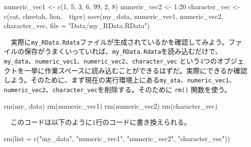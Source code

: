 \documentclass[
  a4paper,
  pandoc,
  ja=standard,
  jafont=haranoaji]{bxjsbook}
\newenvironment{Shaded}{\begin{snugshade}}{\end{snugshade}}
\newcommand{\AttributeTok}[1]{\textcolor[rgb]{0.00,0.48,0.65}{#1}}
\newcommand{\DecValTok}[1]{\textcolor[rgb]{0.68,0.00,0.00}{#1}}
\newcommand{\FunctionTok}[1]{\textcolor[rgb]{0.28,0.35,0.67}{#1}}
\newcommand{\NormalTok}[1]{\textcolor[rgb]{0.00,0.48,0.65}{#1}}
\newcommand{\OtherTok}[1]{\textcolor[rgb]{0.00,0.48,0.65}{#1}}
\newcommand{\SpecialCharTok}[1]{\textcolor[rgb]{0.37,0.37,0.37}{#1}}
\newcommand{\StringTok}[1]{\textcolor[rgb]{0.13,0.47,0.30}{#1}}
\begin{document}
\begin{Shaded}
\begin{Highlighting}[numbers=left,,]
\NormalTok{numeric\_vec1  }\OtherTok{\textless{}{-}} \FunctionTok{c}\NormalTok{(}\DecValTok{1}\NormalTok{, }\DecValTok{5}\NormalTok{, }\DecValTok{3}\NormalTok{, }\DecValTok{6}\NormalTok{, }\DecValTok{99}\NormalTok{, }\DecValTok{2}\NormalTok{, }\DecValTok{8}\NormalTok{)}
\NormalTok{numeric\_vec2  }\OtherTok{\textless{}{-}} \DecValTok{1}\SpecialCharTok{:}\DecValTok{20}
\NormalTok{character\_vec }\OtherTok{\textless{}{-}} \FunctionTok{c}\NormalTok{(}\StringTok{\textquotesingle{}cat\textquotesingle{}}\NormalTok{, }\StringTok{\textquotesingle{}cheetah\textquotesingle{}}\NormalTok{, }\StringTok{\textquotesingle{}lion\textquotesingle{}}\NormalTok{,　}\StringTok{\textquotesingle{}tiger\textquotesingle{}}\NormalTok{)}
\FunctionTok{save}\NormalTok{(my\_data, numeric\_vec1, numeric\_vec2, character\_vec, }
     \AttributeTok{file =} \StringTok{"Data/my\_RData.RData"}\NormalTok{)}
\end{Highlighting}
\end{Shaded}

　実際に\texttt{my\_RData.Rdata}ファイルが生成されているかを確認してみよう。ファイルの保存がうまくいっていれば、\texttt{my\_RData.Rdata}を読み込むだけで、\texttt{my\_data}、\texttt{numeric\_vec1}、\texttt{numeric\_vec2}、\texttt{character\_vec}
という4つのオブジェクトを一挙に作業スペースに読み込むことができるはずだ。実際にできるか確認しよう。そのために、まず現在の実行環境上にある\texttt{my\_ata}、\texttt{numeric\_vec1}、\texttt{numeric\_vec2}、\texttt{character\_vec}を削除する。そのために
\texttt{rm()} 関数を使う。

\begin{Shaded}
\begin{Highlighting}[numbers=left,,]
\FunctionTok{rm}\NormalTok{(my\_data)}
\FunctionTok{rm}\NormalTok{(numeric\_vec1)}
\FunctionTok{rm}\NormalTok{(numeric\_vec2)}
\FunctionTok{rm}\NormalTok{(character\_vec)}
\end{Highlighting}
\end{Shaded}

　このコードは以下のように1行のコードに書き換えられる。

\begin{Shaded}
\begin{Highlighting}[numbers=left,,]
\FunctionTok{rm}\NormalTok{(}\AttributeTok{list =} \FunctionTok{c}\NormalTok{(}\StringTok{"my\_data"}\NormalTok{, }\StringTok{"numeric\_vec1"}\NormalTok{, }\StringTok{"numeric\_vec2"}\NormalTok{, }\StringTok{"character\_vec"}\NormalTok{))}
\end{Highlighting}
\end{Shaded}
\end{document}
